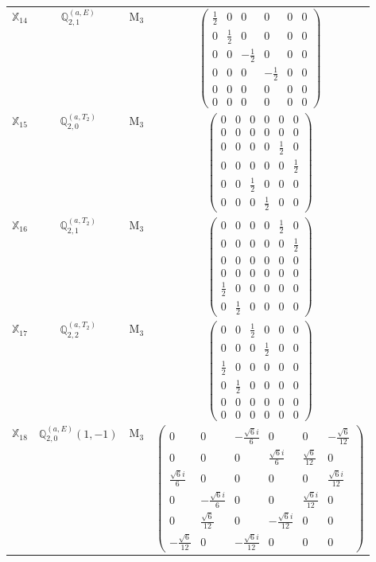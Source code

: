 \documentclass[fleqn,10pt,landscape]{article}
\begin{document}
\begin{itemize}
\begin{center}
\begin{longtable}{c|c|c|c}
$ \mathbb{X}_{14} $ & $\mathbb{Q}_{2,1}^{(a,E)}$ & M$_{3}$ & $\begin{pmatrix} \frac{1}{2} & 0 & 0 & 0 & 0 & 0 \\ 0 & \frac{1}{2} & 0 & 0 & 0 & 0 \\ 0 & 0 & - \frac{1}{2} & 0 & 0 & 0 \\ 0 & 0 & 0 & - \frac{1}{2} & 0 & 0 \\ 0 & 0 & 0 & 0 & 0 & 0 \\ 0 & 0 & 0 & 0 & 0 & 0 \end{pmatrix}$ \\
$ \mathbb{X}_{15} $ & $\mathbb{Q}_{2,0}^{(a,T_{2})}$ & M$_{3}$ & $\begin{pmatrix} 0 & 0 & 0 & 0 & 0 & 0 \\ 0 & 0 & 0 & 0 & 0 & 0 \\ 0 & 0 & 0 & 0 & \frac{1}{2} & 0 \\ 0 & 0 & 0 & 0 & 0 & \frac{1}{2} \\ 0 & 0 & \frac{1}{2} & 0 & 0 & 0 \\ 0 & 0 & 0 & \frac{1}{2} & 0 & 0 \end{pmatrix}$ \\
$ \mathbb{X}_{16} $ & $\mathbb{Q}_{2,1}^{(a,T_{2})}$ & M$_{3}$ & $\begin{pmatrix} 0 & 0 & 0 & 0 & \frac{1}{2} & 0 \\ 0 & 0 & 0 & 0 & 0 & \frac{1}{2} \\ 0 & 0 & 0 & 0 & 0 & 0 \\ 0 & 0 & 0 & 0 & 0 & 0 \\ \frac{1}{2} & 0 & 0 & 0 & 0 & 0 \\ 0 & \frac{1}{2} & 0 & 0 & 0 & 0 \end{pmatrix}$ \\
$ \mathbb{X}_{17} $ & $\mathbb{Q}_{2,2}^{(a,T_{2})}$ & M$_{3}$ & $\begin{pmatrix} 0 & 0 & \frac{1}{2} & 0 & 0 & 0 \\ 0 & 0 & 0 & \frac{1}{2} & 0 & 0 \\ \frac{1}{2} & 0 & 0 & 0 & 0 & 0 \\ 0 & \frac{1}{2} & 0 & 0 & 0 & 0 \\ 0 & 0 & 0 & 0 & 0 & 0 \\ 0 & 0 & 0 & 0 & 0 & 0 \end{pmatrix}$ \\
$ \mathbb{X}_{18} $ & $\mathbb{Q}_{2,0}^{(a,E)}(1,-1)$ & M$_{3}$ & $\begin{pmatrix} 0 & 0 & - \frac{\sqrt{6} i}{6} & 0 & 0 & - \frac{\sqrt{6}}{12} \\ 0 & 0 & 0 & \frac{\sqrt{6} i}{6} & \frac{\sqrt{6}}{12} & 0 \\ \frac{\sqrt{6} i}{6} & 0 & 0 & 0 & 0 & \frac{\sqrt{6} i}{12} \\ 0 & - \frac{\sqrt{6} i}{6} & 0 & 0 & \frac{\sqrt{6} i}{12} & 0 \\ 0 & \frac{\sqrt{6}}{12} & 0 & - \frac{\sqrt{6} i}{12} & 0 & 0 \\ - \frac{\sqrt{6}}{12} & 0 & - \frac{\sqrt{6} i}{12} & 0 & 0 & 0 \end{pmatrix}$ \\

\end{longtable}
\end{center}
\end{itemize}
\end{document}
